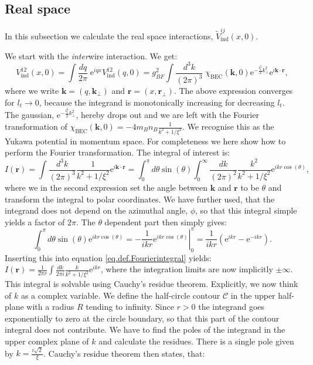 \subsection{Real space}
\label{subsec.inducedinteraction.realspace}
In this subsection we calculate the real space interactions, $\tilde{V}^{ij}_{\text{ind}}(x, 0)$. 

We start with the \textit{inter}wire interaction. We get:
\begin{equation}
V^{12}_{\text{ind}}(x, 0) = \int \frac{dq}{2\pi} \; \text{e}^{iqx} V^{12}_{\text{ind}}(q, 0) = g^2_{BF}\int \frac{d^3 k}{(2\pi)^3}\;\chi_\text{BEC}(\mathbf{k}, 0)\text{e}^{-\frac{l_t^2}{2}k_\perp^2}\text{e}^{i\mathbf{k}\cdot \mathbf{r}}, \nonumber
\end{equation}
where we write $\mathbf{k} = (q, \mathbf{k}_{\perp})$ and $\mathbf{r} = (x, \mathbf{r}_{\perp})$. The above expression converges for $l_t \to 0$, because the integrand is monotonically increasing for decreasing $l_t$. The gaussian, $\text{e}^{-\frac{l_t^2}{2}k_\perp^2}$, hereby drops out and we are left with the Fourier transformation of $\chi_\text{BEC}(\mathbf{k}, 0) = -4m_Bn_B\frac{1}{k^2 + 1/\xi^2}$. We recognise this as the Yukawa potential in momentum space. For completeness we here show how to perform the Fourier transformation. The integral of interest is:
\begin{equation}
I(\mathbf{r}) = \int \frac{d^3 k}{(2\pi)^3} \frac{1}{k^2 + 1/\xi^2}\text{e}^{i\mathbf{k}\cdot\mathbf{r}} = \int_{0}^{\pi}d\theta \sin(\theta)\int_{0}^{\infty}\frac{dk}{(2\pi)^2} \frac{k^2}{k^2 + 1/\xi^2}\text{e}^{ikr\cos(\theta)},
\label{eq.def.Fourierintegral}
\end{equation}
where we in the second expression set the angle between $\mathbf{k}$ and $\mathbf{r}$ to be $\theta$ and transform the integral to polar coordinates. We have further used, that the integrand does not depend on the azimuthal angle, $\phi$, so that this integral simple yields a factor of $2\pi$. The $\theta$ dependent part then simply gives:
\begin{equation}
\int_{0}^{\pi}d\theta \sin(\theta)\text{e}^{ikr\cos(\theta)} = -\left.\frac{1}{ikr}\text{e}^{ikr\cos(\theta)}\right|_{0}^{\pi} = \frac{1}{ikr}\left(\text{e}^{ikr} - \text{e}^{-ikr}\right). \nonumber
\end{equation}
Inserting this into equation \eqref{eq.def.Fourierintegral} yields: $I(\mathbf{r}) = \frac{1}{2\pi r}\int \frac{dk}{2\pi i} \frac{k}{k^2 + 1/\xi^2}\text{e}^{ikr}$, where the integration limits are now implicitly $\pm \infty$. This integral is solvable using Cauchy's residue theorem. Explicitly, we now think of $k$ as a complex variable. We define the half-circle contour $\mathcal{C}$ in the upper half-plane with a radius $R$ tending to infinity. Since $r > 0$ the integrand goes exponentially to zero at the circle boundary, so that this part of the contour integral does not contribute. We have to find the poles of the integrand in the upper complex plane of $k$ and calculate the residues. There is a single pole given by $k = \frac{i\sqrt{2}}{\xi}$. Cauchy's residue theorem then states, that:
